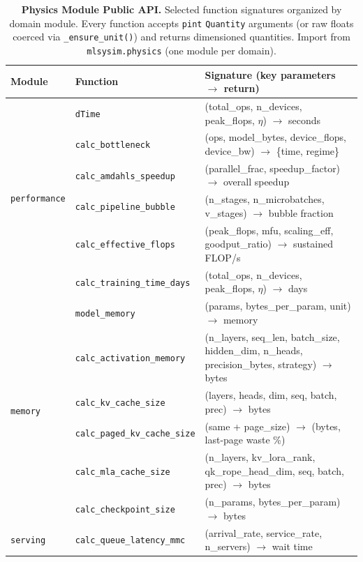 \documentclass[10pt,twocolumn]{article}
\begin{document}
\begin{appendices}
\begin{table}[!t]
\centering
\footnotesize
\renewcommand{\arraystretch}{1.0}
\caption{\textbf{Physics Module Public API.} Selected function signatures organized by domain module. Every function accepts \texttt{pint} \texttt{Quantity} arguments (or raw floats coerced via \texttt{\_ensure\_unit()}) and returns dimensioned quantities. Import from \texttt{mlsysim.physics} (one module per domain).}
\label{tab:physics-api}
\begin{tabularx}{\textwidth}{@{}l l X@{}}
\toprule
\textbf{Module} & \textbf{Function} & \textbf{Signature (key parameters $\to$ return)} \\
\midrule
\multirow{6}{*}{\texttt{performance}} & \texttt{dTime} & (total\_ops, n\_devices, peak\_flops, $\eta$) $\to$ seconds \\
 & \texttt{calc\_bottleneck} & (ops, model\_bytes, device\_flops, device\_bw) $\to$ \{time, regime\} \\
 & \texttt{calc\_amdahls\_speedup} & (parallel\_frac, speedup\_factor) $\to$ overall speedup \\
 & \texttt{calc\_pipeline\_bubble} & (n\_stages, n\_microbatches, v\_stages) $\to$ bubble fraction \\
 & \texttt{calc\_effective\_flops} & (peak\_flops, mfu, scaling\_eff, goodput\_ratio) $\to$ sustained FLOP/s \\
 & \texttt{calc\_training\_time\_days} & (total\_ops, n\_devices, peak\_flops, $\eta$) $\to$ days \\
\midrule
\multirow{6}{*}{\texttt{memory}} & \texttt{model\_memory} & (params, bytes\_per\_param, unit) $\to$ memory \\
 & \texttt{calc\_activation\_memory} & (n\_layers, seq\_len, batch\_size, hidden\_dim, n\_heads, precision\_bytes, strategy) $\to$ bytes \\
 & \texttt{calc\_kv\_cache\_size} & (layers, heads, dim, seq, batch, prec) $\to$ bytes \\
 & \texttt{calc\_paged\_kv\_cache\_size} & (same + page\_size) $\to$ (bytes, last-page waste \%) \\
 & \texttt{calc\_mla\_cache\_size} & (n\_layers, kv\_lora\_rank, qk\_rope\_head\_dim, seq, batch, prec) $\to$ bytes \\
 & \texttt{calc\_checkpoint\_size} & (n\_params, bytes\_per\_param) $\to$ bytes \\
\midrule
\texttt{serving} & \texttt{calc\_queue\_latency\_mmc} & (arrival\_rate, service\_rate, n\_servers) $\to$ wait time \\

\end{tabularx}
\end{table}
\end{appendices}
\end{document}
